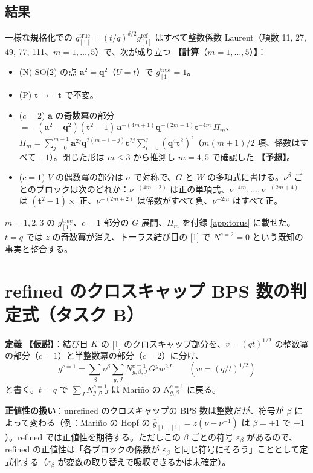 \documentclass[a4paper,10pt]{ltjsarticle}
\newcommand{\ba}{\bm{a}}
\newcommand{\bq}{\bm{q}}
\newcommand{\bt}{\bm{t}}
\newcommand{\comp}[1]{\textbf{【計算}\if\relax\detokenize{#1}\relax\else（#1）\fi\textbf{】}}
\newcommand{\conj}{\textbf{【予想】}}
\newcommand{\hyp}{\textbf{【仮説】}}
\begin{document}
\subsection{結果}
一様な規格化での $g^{\mathrm{true}}_{[1]} = (t/q)^{\delta/2} g^{\mathrm{ref}}_{[1]}$ はすべて整数係数 Laurent（項数 11, 27, 49, 77, 111、$m = 1, \dots, 5$）で、次が成り立つ \comp{$m = 1, \dots, 5$}：
\begin{itemize}
\item (N) SO(2) の点 $\ba^2 = \bq^2$（$U = t$）で $g^{\mathrm{true}}_{[1]} = 1$。
\item (P) $\bt \to -\bt$ で不変。
\item ($c = 2$) $\ba$ の奇数冪の部分 $= -(\ba^2 - \bq^2)(\bt^2 - 1)\, \ba^{-(4m+1)} \bq^{-(2m-1)} \bt^{-4m}\, \Pi_m$、$\Pi_m = \sum_{j=0}^{m-1} \ba^{2j} \bq^{2(m-1-j)} \bt^{2j} \sum_{i=0}^{j} (\bq^4 \bt^2)^i$（$m(m+1)/2$ 項、係数はすべて $+1$）。閉じた形は $m \le 3$ から推測し $m = 4, 5$ で確認した \conj。
\item ($c = 1$) $V$ の偶数冪の部分は $\sigma$ で対称で、$G$ と $W$ の多項式に書ける。$\nu^\beta$ ごとのブロックは次のどれか：$\nu^{-(4m+2)}$ は正の単項式、$\nu^{-4m}, \dots, \nu^{-(2m+4)}$ は $(\bt^2 - 1) \times$ 正、$\nu^{-(2m+2)}$ は係数がすべて負、$\nu^{-2m}$ はすべて正。
\end{itemize}
$m = 1, 2, 3$ の $g^{\mathrm{true}}_{[1]}$、$c = 1$ 部分の $G$ 展開、$\Pi_m$ を付録 \ref{app:torus} に載せた。$t = q$ では $z$ の奇数冪が消え、トーラス結び目の [1] で $N^{c=2} = 0$ という既知の事実と整合する。

\section{refined のクロスキャップ BPS 数の判定式（タスク B）}\label{sec:criterion}
\textbf{定義} \hyp：結び目 $K$ の [1] のクロスキャップ部分を、$v = (qt)^{1/2}$ の整数冪の部分（$c = 1$）と半整数冪の部分（$c = 2$）に分け、
\[
g^{c=1} = \sum_\beta \nu^\beta \sum_{g, J} N^{c=1}_{g, \beta, J}\, G^g w^{2J}\qquad (w = (q/t)^{1/2})
\]
と書く。$t = q$ で $\sum_J N^{c=1}_{g,\beta,J}$ は Mariño の $N^{c=1}_{g,\beta}$ に戻る。

\textbf{正値性の扱い}：unrefined のクロスキャップの BPS 数は整数だが、符号が $\beta$ によって変わる（例：Mariño の Hopf の $\hat g_{[1],[1]} = z(\nu - \nu^{-1})$ は $\beta = \pm 1$ で $\pm 1$）。refined では正値性を期待する。ただしこの $\beta$ ごとの符号 $\varepsilon_\beta$ があるので、refined の正値性は「各ブロックの係数が $\varepsilon_\beta$ と同じ符号にそろう」こととして定式化する（$\varepsilon_\beta$ が変数の取り替えで吸収できるかは未確定）。
\end{document}
